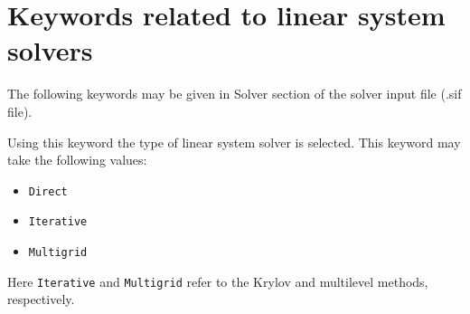 %





\section{Keywords related to linear system solvers}

The following keywords may be given in Solver section of the solver input file (.sif file).

\sifbegin
{}
Using this keyword the type of linear system solver is selected. This keyword may take  
the following values:
\begin{itemize}
\item {\tt Direct}
\item {\tt Iterative}
\item {\tt Multigrid}
\end{itemize}
Here {\tt Iterative} and {\tt Multigrid} refer to the Krylov and multilevel methods,
respectively.   

